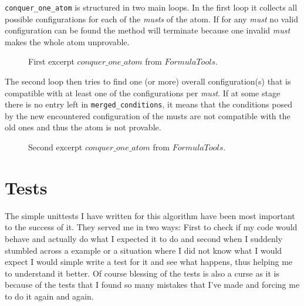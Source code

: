 \texttt{conquer\_one\_atom} is structured in two main loops. In the first loop it collects all possible configurations for each of the \emph{musts} of the atom. If for any \emph{must} no valid configuration can be found the method will terminate because one invalid \emph{must} makes the whole atom unprovable.

\begin{figure}[H]
	\vspace{-10pt}
	
	\vspace{-10pt}
	\caption{First excerpt $conquer\_one\_ atom$ from $FormulaTools$.}
	\vspace{-10pt}
\end{figure}

The second loop then tries to find one (or more) overall configuration(s) that is compatible with at least one of the configurations per \emph{must}. If at some stage there is no entry left in \texttt{merged\_conditions}, it means that the conditions posed by the new encountered configuration of the musts are not compatible with the old ones and thus the atom is not provable.

\begin{figure}[H]
	\vspace{-10pt}
	
	\vspace{-10pt}
	\caption{Second excerpt $conquer\_one\_ atom$ from $FormulaTools$.}
	\vspace{-10pt}
\end{figure}

\bigskip


\section{Tests}
The simple unittests I have written for this algorithm have been most important to the success of it. They served me in two ways: First to check if my code would behave and actually do what I expected it to do and second when I suddenly stumbled across a example or a situation where I did not know what I would expect I would simple write a test for it and see what happens, thus helping me to understand it better.
Of course blessing of the tests is also a curse as it is because of the tests that I found so many mistakes that I've made and forcing me to do it again and again.

